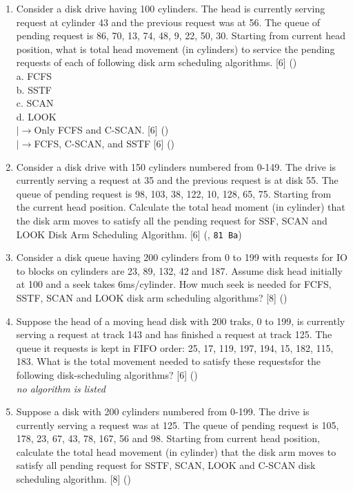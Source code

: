 \documentclass[12pt]{article}
\newcommand{\lb}{\\$\left|\rightarrow\right.$}
\begin{document}
		\begin{enumerate}
			\item Consider a disk drive having 100 cylinders. The head is currently serving request at cylinder 43 and the previous request was at 56. The queue of pending request is 86, 70, 13, 74, 48, 9, 22, 50, 30. Starting from current head position, what is total head movement (in cylinders) to service the pending requests of each of following disk arm scheduling algorithms. \hfill [6] ()\\
			a. FCFS\\
			b. SSTF\\
			c. SCAN\\
			d. LOOK
			\lb Only FCFS and C-SCAN. \hfill [6] ()
			\lb FCFS, C-SCAN, and SSTF \hfill [6] ()

			\item Consider a disk drive with 150 cylinders numbered from 0-149. The drive is currently serving a request at 35 and the previous request is at disk 55. The queue of pending request is 98, 103, 38, 122, 10, 128, 65, 75. Starting from the current head position. Calculate the total head moment (in cylinder) that the disk arm moves to satisfy all the pending request for SSF, SCAN and LOOK Disk Arm Scheduling Algorithm. \hfill [6] (, \texttt{81 Ba})

			\item Consider a disk queue having 200 cylinders from 0 to 199 with requests for IO to blocks on cylinders are 23, 89, 132, 42 and 187. Assume disk head initially at 100 and a seek takes 6ms/cylinder. How much seek is needed for FCFS, SSTF, SCAN and LOOK disk arm scheduling algorithms? \hfill [8] ()

			\item Suppose the head of a moving head disk with 200 traks, 0 to 199, is currently serving a request at track 143 and has finished a request at track 125. The queue it requests is kept in FIFO order: 25, 17, 119, 197, 194, 15, 182, 115, 183. What is the total movement needed to satisfy these requestsfor the following disk-scheduling algorithms? \hfill [6] ()\\
			\textit{no algorithm is listed}

			\item Suppose a disk with 200 cylinders numbered from 0-199. The drive is currently serving a request was at 125. The queue of pending request is 105, 178, 23, 67, 43, 78, 167, 56 and 98. Starting from current head position, calculate the total head movement (in cylinder) that the disk arm moves to satisfy all pending request for SSTF, SCAN, LOOK and C-SCAN disk scheduling algorithm. \hfill [8] ()


\end{enumerate}
\end{document}
